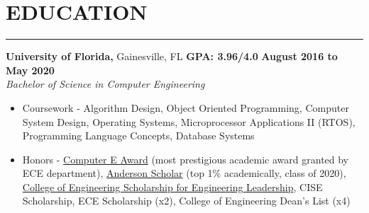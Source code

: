 \section*{EDUCATION}

\hrule \relax
\sectionheaderspace

\noindent \textbf{University of Florida,} Gainesville, FL
\hfill\textbf{GPA: 3.96/4.0}
\hfill\textbf{August 2016 to May 2020}\\
\textit{Bachelor of Science in Computer Engineering}
\begin{itemize}[noitemsep,nolistsep, label = {-}]
	\item  Coursework - 
		Algorithm Design,
		Object Oriented Programming,
		Computer System Design,
		Operating Systems,
		Microprocessor Applications II (RTOS),
		Programming Language Concepts,
		Database Systems
	\item  Honors - 
		\href{https://www.ece.ufl.edu/people/student-awards/}
				{Computer E Award} (most prestigious academic award granted by ECE department),
		\href{https://sites.clas.ufl.edu/clas-main/undergraduate/anderson-scholars/anderson-scholars-listing/}
				{Anderson Scholar} (top 1\% academically, class of 2020),
		\href{https://www.eng.ufl.edu/leadership/students/scholarships/thomas-o-hunter-leadership/}
				{College of Engineering Scholarship for Engineering Leadership},
		CISE Scholarship,
		ECE Scholarship (x2),
		College of Engineering Dean\rq s List (x4)
\end{itemize}
\subsectionspace
